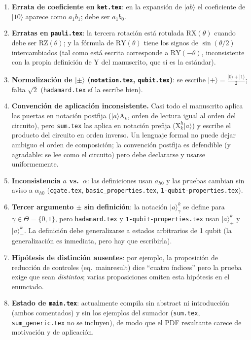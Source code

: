 \documentclass[12pt, a4paper]{article}
\newcommand{\gate}[1]{\text{#1}}
\newcommand{\stateket}[3]{\ket{#1}^{#2}_{#3}}
\newcommand{\stategate}[3]{\gate{#1}^{#2}_{#3}}
\newcommand{\ket}[1]{|#1\rangle}
\begin{document}
\begin{enumerate}
  \item \textbf{Errata de coeficiente en \texttt{ket.tex}}: en la expansión
        de $\ket{ab}$ el coeficiente de $\ket{10}$ aparece como $a_1 b_1$;
        debe ser $a_1 b_0$.

  \item \textbf{Erratas en \texttt{pauli.tex}}: la tercera rotación está
        rotulada $\gate{RX}(\theta)$ cuando debe ser $\gate{RZ}(\theta)$; y
        la fórmula de $\gate{RY}(\theta)$ tiene los signos de
        $\sin(\theta/2)$ intercambiados (tal como está escrita corresponde a
        $\gate{RY}(-\theta)$, inconsistente con la propia definición de
        $\gate{Y}$ del manuscrito, que sí es la estándar).

  \item \textbf{Normalización de $\ket{\pm}$ (\texttt{notation.tex},
          \texttt{qubit.tex})}: se escribe
        $\ket{+}=\frac{\ket{0}+\ket{1}}{2}$; falta $\sqrt{2}$
        (\texttt{hadamard.tex} sí la escribe bien).

  \item \textbf{Convención de aplicación inconsistente.} Casi todo el
        manuscrito aplica las puertas en notación postfija
        ($\ket{a}\gate{A}_k$, orden de lectura igual al orden del circuito),
        pero \texttt{sum.tex} las aplica en notación prefija
        ($\stategate{X}{h}{k}\ket{a}$) y escribe el producto del circuito en
        orden inverso. Un lenguaje formal no puede dejar ambiguo el orden de
        composición; la convención postfija es defendible (y agradable: se
        lee como el circuito) pero debe declararse y usarse uniformemente.

  \item \textbf{Inconsistencia $a$ vs.\ $\alpha$}: las definiciones usan
        $a_{h0}$ y las pruebas cambian sin aviso a $\alpha_{h0}$
        (\texttt{cgate.tex}, \texttt{basic\_properties.tex},
        \texttt{1-qubit-properties.tex}).

  \item \textbf{Tercer argumento $\pm$ sin definición}: la notación
        $\stateket{a}{k}{\gamma}$ se define para $\gamma\in\Theta=\{0,1\}$,
        pero \texttt{hadamard.tex} y \texttt{1-qubit-properties.tex} usan
        $\stateket{a}{k}{+}$ y $\stateket{a}{k}{-}$. La definición debe
        generalizarse a estados arbitrarios de 1 qubit (la generalización es
        inmediata, pero hay que escribirla).

  \item \textbf{Hipótesis de distinción ausentes}: por ejemplo, la
        proposición de reducción de controles (eq.~mainresult) dice ``cuatro
        índices'' pero la prueba exige que sean \emph{distintos}; varias
        proposiciones omiten esta hipótesis en el enunciado.

  \item \textbf{Estado de \texttt{main.tex}}: actualmente compila sin
        abstract ni introducción (ambos comentados) y sin los ejemplos del
        sumador (\texttt{sum.tex}, \texttt{sum\_generic.tex} no se incluyen),
        de modo que el PDF resultante carece de motivación y de aplicación.
\end{enumerate}
\end{document}
